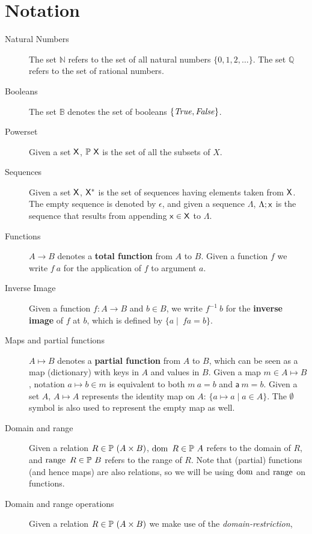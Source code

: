 \section{Notation}\label{sec:notation}

\begin{description}
\item[Natural Numbers] The set $\mathbb{N}$ refers to the set of all natural
  numbers $\{0, 1, 2, \ldots\}$. The set $\mathbb{Q}$ refers to the set of
  rational numbers.
\item[Booleans] The set $\mathbb{B}$ denotes the set of booleans
  $\{\mathit{True}, \mathit{False}\}$.
\item[Powerset] Given a set $\mathsf{X}$, $\mathbb{P}~\mathsf{X}$ is the set of all
  the subsets of $X$.
\item[Sequences] Given a set $\mathsf{X}$, $\mathsf{X}^{*}$ is the set of
  sequences having elements taken from $\mathsf{X}$. The empty sequence is
  denoted by $\epsilon$, and given a sequence $\Lambda$, $\Lambda; \mathsf{x}$ is
  the sequence that results from appending $\mathsf{x} \in \mathsf{X}$ to
  $\Lambda$.
\item[Functions] $A \to B$ denotes a \textbf{total function} from $A$ to $B$.
  Given a function $f$ we write $f~a$ for the application of $f$ to argument
  $a$.
\item[Inverse Image] Given a function $f: A \to B$ and $b\in B$, we write
  $f^{-1}~b$ for the \textbf{inverse image} of $f$ at $b$, which is defined by
  $\{a \mid\ f a =  b\}$.
\item[Maps and partial functions] $A \mapsto B$ denotes a \textbf{partial
    function} from $A$ to $B$, which can be seen as a map (dictionary) with
  keys in $A$ and values in $B$. Given a map $m \in A \mapsto B$, notation
  $a \mapsto b \in m$ is equivalent to both $m~ a = b$ and $\mathsf{a}~m = b$.
  Given a set $A$, $A \mapsto A$ represents the identity map on $A$:
  $\{a \mapsto a \mid a \in A\}$. The $\emptyset$ symbol is also used to
  represent the empty map as well.
\item[Domain and range] Given a relation $R \in \mathbb{P}~(A \times B)$,
  $\operatorname{dom}~R \in \mathbb{P}~A$ refers to the domain of $R$, and
  $\operatorname{range}~R \in \mathbb{P}~B$ refers to the range of $R$. Note that (partial)
  functions (and hence maps) are also relations, so we will be using $\operatorname{dom}$ and
  $\operatorname{range}$ on functions.
\item[Domain and range operations] Given a relation
  $R \in \mathbb{P}~(A \times B)$ we make use of the \textit{domain-restriction},

\end{description}
